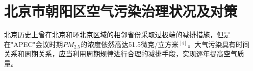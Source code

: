 \documentclass[UTF8]{ctexart}
\begin{document}










\newpage
\section{北京市朝阳区空气污染治理状况及对策}
北京历史上曾在北京和环北京区域的相邻省份采取过极端的减排措施，但是在"APEC"会议时期$PM_{2.5}$的浓度依然高达51.5微克/立方米$^{[4]}$。大气污染具有时间关系和周期关系，应当利用周期规律进行合理的减排手段，实现逐年提高空气质量。
\end{document}
